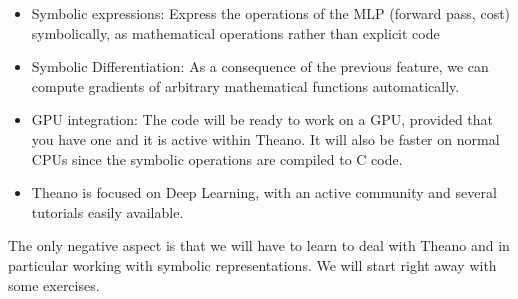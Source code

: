 \begin{itemize}
\item Symbolic expressions: Express the operations of the MLP (forward pass, cost) symbolically, as mathematical operations rather than explicit code 
\item Symbolic Differentiation: As a consequence of the previous feature, we can compute gradients of arbitrary mathematical functions automatically.   
\item GPU integration: The code will be ready to work on a GPU, provided that you have one and it is active within Theano. It will also be faster on normal CPUs since the symbolic operations are compiled to C code. 
\item Theano is focused on Deep Learning, with an active community and several tutorials easily available.  
\end{itemize}

The only negative aspect is that we will have to learn to deal with Theano and
in particular working with symbolic representations. We will start right away
with some exercises.

